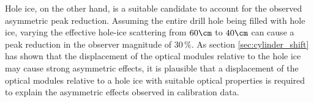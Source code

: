 Hole ice, on the other hand, is a suitable candidate to account for the observed asymmetric peak reduction. Assuming the entire drill hole being filled with hole ice, varying the effective hole-ice scattering from $60\cm$ to $40\cm$ can cause a peak reduction in the observer magnitude of $30\,\%$. As section \ref{sec:cylinder_shift} has shown that the displacement of the optical modules relative to the hole ice may cause strong asymmetric effects, it is plausible that a displacement of the optical modules relative to a hole ice with suitable optical properties is required to explain the asymmetric effects observed in calibration data.
